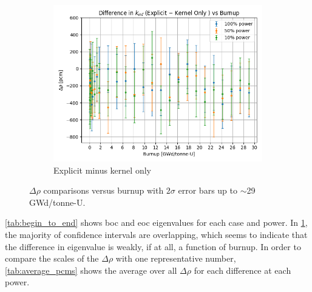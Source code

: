 \documentclass[letterpaper]{physor2024}
\begin{document}
\begin{figure}[!h]
\begin{subfigure}{0.495\linewidth}
        \includegraphics[width=\linewidth]{figures/explicit_minus_kern.png}
        \caption{Explicit minus kernel only}
    \end{subfigure}
    \caption{$\Delta \rho$ comparisons versus burnup with $2\sigma$ error bars up to $\sim$29 GWd/tonne-U.}
    \label{fig:pcm_diffs}
    \vspace*{-0.2cm}
\end{figure}

\cref{tab:begin_to_end} shows \gls{boc} and \gls{eoc} eigenvalues for each case and power. In \cref{fig:pcm_diffs}, the majority of confidence intervals are overlapping, which seems to indicate that the difference in eigenvalue is weakly, if at all, a function of burnup. In order to compare the scales of the $\Delta \rho$ with one representative number, \cref{tab:average_pcms} shows the average over all $\Delta \rho$ for each difference at each power.
\end{document}
